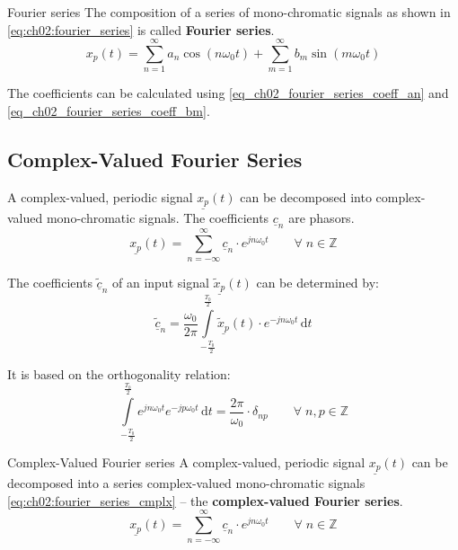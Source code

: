\begin{refsection}
\begin{definition}{Fourier series}
	The composition of a series of mono-chromatic signals as shown in \eqref{eq:ch02:fourier_series} is called  \textbf{Fourier series}.
	\begin{equation*}
		x_p(t) = \sum\limits_{n=1}^{\infty} a_n \cos\left(n \omega_0 t\right) + \sum\limits_{m=1}^{\infty} b_m \sin\left(m \omega_0 t\right)
	\end{equation*}
	
	The coefficients can be calculated using \eqref{eq_ch02_fourier_series_coeff_an} and \eqref{eq_ch02_fourier_series_coeff_bm}.
\end{definition}

\subsection{Complex-Valued Fourier Series}

A complex-valued, periodic signal $\underline{x_p}(t)$ can be decomposed into complex-valued mono-chromatic signals. The coefficients $\underline{c}_n$ are phasors.
\begin{equation}
	\underline{x_p}(t) = \sum\limits_{n = -\infty}^{\infty} \underline{c}_n \cdot e^{j n \omega_0 t} \qquad \forall \; n \in \mathbb{Z}
	\label{eq:ch02:fourier_series_cmplx}
\end{equation}

The coefficients $\underline{\tilde{c}}_n$ of an input signal $\underline{\tilde{x}_p}(t)$ can be determined by:
\begin{equation}
	\underline{\tilde{c}}_n = \frac{\omega_0}{2 \pi} \int\limits_{-\frac{T_0}{2}}^{\frac{T_0}{2}} \underline{\tilde{x}_p}(t) \cdot e^{-j n \omega_0 t} \, \mathrm{d} t
	\label{eq_ch02_fourier_series_coeff_cn}
\end{equation}

It is based on the orthogonality relation:
\begin{equation}
	\int\limits_{-\frac{T_0}{2}}^{\frac{T_0}{2}} e^{j n \omega_0 t} e^{-j p \omega_0 t} \, \mathrm{d} t = \frac{2 \pi}{\omega_0} \cdot \delta_{np} \qquad \forall \; n, p \in \mathbb{Z}
	\label{eq:ch02:orth_rel_exp}
\end{equation}

\begin{definition}{Complex-Valued Fourier series}
	A complex-valued, periodic signal $\underline{x_p}(t)$ can be decomposed into a series complex-valued mono-chromatic signals \eqref{eq:ch02:fourier_series_cmplx} -- the  \textbf{complex-valued Fourier series}.
	\begin{equation*}
		\underline{x_p}(t) = \sum\limits_{n = -\infty}^{\infty} \underline{c}_n \cdot e^{j n \omega_0 t} \qquad \forall \; n \in \mathbb{Z}
	\end{equation*}
	

\end{definition}
\end{refsection}
